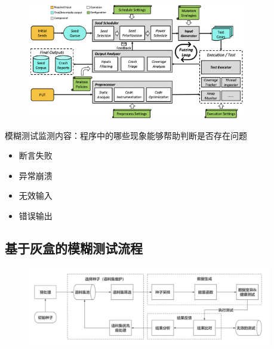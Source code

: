 \begin{figure}[H]
    \vspace{-0.5em}
	\centering
	\includegraphics[width=0.85\textwidth]{images/模糊测试框架2.png}
    \vspace{-1em}
\end{figure}

模糊测试监测内容：程序中的哪些现象能够帮助判断是否存在问题
\vspace{-0.5em}
\begin{multicols}{2}
    \begin{itemize}
        \item 断言失败
        \item 异常崩溃
        \item 无效输入
        \item 错误输出
    \end{itemize}
\end{multicols}
\vspace{-1em}

\subsection{基于灰盒的模糊测试流程}
\begin{figure}[H]
    \vspace{-0.5em}
	\centering
	\includegraphics[width=0.95\textwidth]{images/基于灰盒的模糊测试流程.png}
    \vspace{-1em}
\end{figure}

